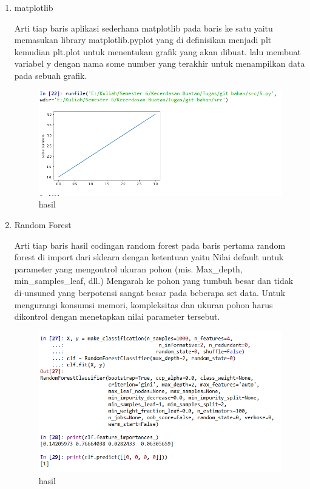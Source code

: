 \begin{enumerate}
\item matplotlib\par
Arti tiap baris aplikasi sederhana matplotlib pada baris ke satu yaitu memasukan library matplotlib.pyplot yang di definisikan menjadi plt kemudian plt.plot untuk menentukan grafik yang akan dibuat. lalu membuat variabel y dengan nama some number yang terakhir untuk menampilkan data pada sebuah grafik.

\begin{figure}[ht]
\centering
\includegraphics[scale=0.5]{figures/1174012/3/5.PNG}
\caption{hasil}
\label{contoh}
\end{figure}

\item Random Forest\par
Arti tiap baris hasil codingan random forest pada baris pertama random forest di import dari sklearn dengan ketentuan yaitu Nilai default untuk parameter yang mengontrol ukuran pohon (mis. Max\_depth, min\_samples\_leaf, dll.) Mengarah ke pohon yang tumbuh besar dan tidak di-unsuned yang berpotensi sangat besar pada beberapa set data. Untuk mengurangi konsumsi memori, kompleksitas dan ukuran pohon harus dikontrol dengan menetapkan nilai parameter tersebut.

\begin{figure}[ht]
\centering
\includegraphics[scale=0.5]{figures/1174012/3/7.PNG}
\caption{hasil}
\label{contoh}
\end{figure}


\end{enumerate}
